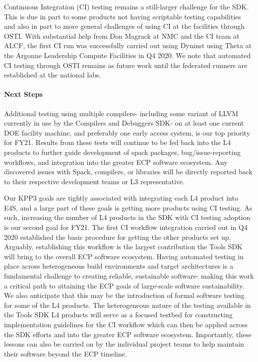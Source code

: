 Continuous Integration (CI) testing remains a still-larger challenge for the SDK. This is due in part to some products not having scriptable testing capabilities and also in part to more general challenges of using CI at the facilities through OSTI. With substantial help from Don Magrack at NMC and the CI team at ALCF, the first CI run was successfully carried out using Dyninst using Theta at the Argonne Leadership Compute Facilities in Q4 2020. We note that automated CI testing through OSTI remains as future work until the federated runners are established at the national labs.


\paragraph{Next Steps}
Additional testing using multiple compilers- including some variant of LLVM currently in use by the Compilers and Debuggers SDK- on at least one current DOE facility machine, and preferably one early access system, is our top priority for FY21. Results from these tests will continue to be fed back into the L4 products to further guide development of spack packages, bug/issue-reporting workflows, and integration into the greater ECP software ecosystem. Any discovered issues with Spack, compilers, or libraries will be directly reported back to their respective development teams or L3 representative.

Our KPP3 goals are tightly associated with integrating each L4 product into E4S, and a large part of these goals is getting more products using CI testing. As such, increasing the number of L4 products in the SDK with CI testing adoption is our second goal for FY21. The first CI workflow integration carried out in Q4 2020 established the basic procedure for getting the other products set up. Arguably, establishing this workflow is the largest contribution the Tools SDK will bring to the overall ECP software ecosystem. Having automated testing in place across heterogeneous build environments and target architectures is a fundamental challenge to creating reliable, sustainable software- making this work a critical path to attaining the ECP goals of large-scale software sustainability. We also anticipate that this may be the introduction of formal software testing for some of the L4 products. The heterogeneous nature of the testing available in the Tools SDK L4 products will serve as a focused testbed for constructing implementation guidelines for the CI workflow which can then be applied across the SDK efforts and into the greater ECP software ecosystem. Importantly, these lessons can also be carried on by the individual project teams to help maintain their software beyond the ECP timeline.
